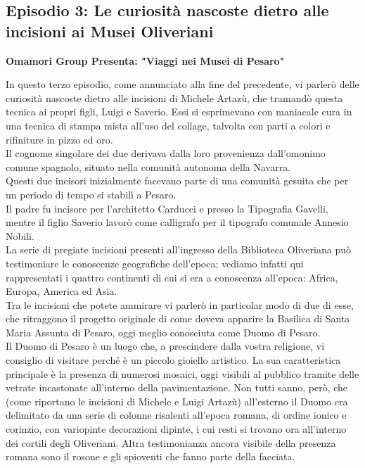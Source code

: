 \documentclass[hidelinks,12pt,a4paper]{article}
\begin{document}
\begin{flushleft}
		\subsection{Episodio 3: Le curiosità nascoste dietro alle incisioni ai Musei Oliveriani}
		\begin{center}
			\textbf{Omamori Group Presenta: "Viaggi nei Musei di Pesaro"}
		\end{center}
		In questo terzo episodio, come annunciato alla fine del precedente, vi parlerò delle curiosità nascoste dietro alle incisioni di Michele Artazù, che tramandò questa tecnica ai propri figli, Luigi e Saverio. Essi si esprimevano con maniacale cura in una tecnica di stampa mista all'uso del collage, talvolta con parti a colori e rifiniture in pizzo ed oro.\\
		Il cognome singolare dei due derivava dalla loro provenienza dall'omonimo comune spagnolo, situato nella comunità autonoma della Navarra.\\
		Questi due incisori inizialmente facevano parte di una comunità gesuita che per un periodo di tempo si stabilì a Pesaro.\\
		Il padre fu incisore per l'architetto Carducci e presso la Tipografia Gavelli, mentre il figlio Saverio lavorò come calligrafo per il tipografo comunale Annesio Nobili.\\
		La serie di pregiate incisioni presenti all'ingresso della Biblioteca Oliveriana può testimoniare le conoscenze geografiche dell'epoca; vediamo infatti qui rappresentati i quattro continenti di cui si era a conoscenza all'epoca: Africa, Europa, America ed Asia.\\
		Tra le incisioni che potete ammirare vi parlerò in particolar modo di due di esse, che ritraggono il progetto originale di come doveva apparire la Basilica di Santa Maria Assunta di Pesaro, oggi meglio conosciuta come Duomo di Pesaro.\\
		Il Duomo di Pesaro è un luogo che, a prescindere dalla vostra religione, vi consiglio di visitare perché è un piccolo gioiello artistico. La sua caratteristica principale è la presenza di numerosi mosaici, oggi visibili al pubblico tramite delle vetrate incastonate all'interno della pavimentazione. Non tutti sanno, però, che (come riportano le incisioni di Michele e Luigi Artazù) all'esterno il Duomo era delimitato da una serie di colonne risalenti all'epoca romana, di ordine ionico e corinzio, con variopinte decorazioni dipinte, i cui resti si trovano ora all'interno dei cortili degli Oliveriani. Altra testimonianza ancora visibile della presenza romana sono il rosone e gli spioventi che fanno parte della facciata.\\

\end{flushleft}
\end{document}
